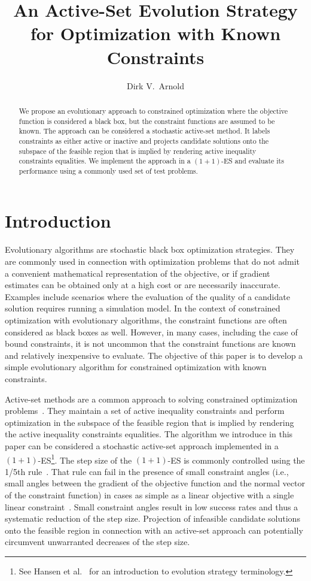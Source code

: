 \documentclass[oribibl]{llncs}
\title{An Active-Set Evolution Strategy for Optimization with Known Constraints}
\author{Dirk V.~Arnold}
\institute{Faculty of Computer Science, Dalhousie University\\
       Halifax, Nova Scotia, Canada B3H 4R2\\
       \email{dirk@cs.dal.ca}}
\begin{document}
\maketitle

\begin{abstract}


We propose an evolutionary approach to constrained optimization where the objective function is considered a black box, but the constraint functions are assumed to be known. The approach can be considered a stochastic active-set method. It labels constraints as either active or inactive and projects candidate solutions onto the subspace of the feasible region that is implied by rendering active inequality constraints equalities. We implement the approach in a $(1+1)$-ES and evaluate its performance using a commonly used set of test problems.
\end{abstract}


\section{Introduction}

Evolutionary algorithms are stochastic black box optimization strategies. They are commonly used in connection with optimization problems that do not admit a convenient mathematical representation of the objective, or if gradient estimates can be obtained only at a high cost or are necessarily inaccurate. Examples include scenarios where the evaluation of the quality of a candidate solution requires running a simulation model. In the context of constrained optimization with evolutionary algorithms, the constraint functions are often considered as black boxes as well. However, in many cases, including the case of bound constraints, it is not uncommon that the constraint functions are known and relatively inexpensive to evaluate. The objective of this paper is to develop a simple evolutionary algorithm for constrained optimization with known constraints.

Active-set methods are a common approach to solving constrained optimization problems~\cite{NW06}. They maintain a set of active inequality constraints and perform optimization in the subspace of the feasible region that is implied by rendering the active inequality constraints equalities. The algorithm we introduce in this paper can be considered a stochastic active-set approach implemented in a $(1+1)$-ES\footnote{See Hansen et al.~\cite{hansen15} for an introduction to evolution strategy terminology.}. The step size of the $(1+1)$-ES is commonly controlled using the 1/5th rule~\cite{rechenberg73}. That rule can fail in the presence of small constraint angles (i.e., small angles between the gradient of the objective function and the normal vector of the constraint function) in cases as simple as a linear objective with a single linear constraint~\cite{schwefel81,arnold08}. Small constraint angles result in low success rates and thus a systematic reduction of the step size. Projection of infeasible candidate solutions onto the feasible region in connection with an active-set approach can potentially circumvent unwarranted decreases of the step size.
\end{document}
